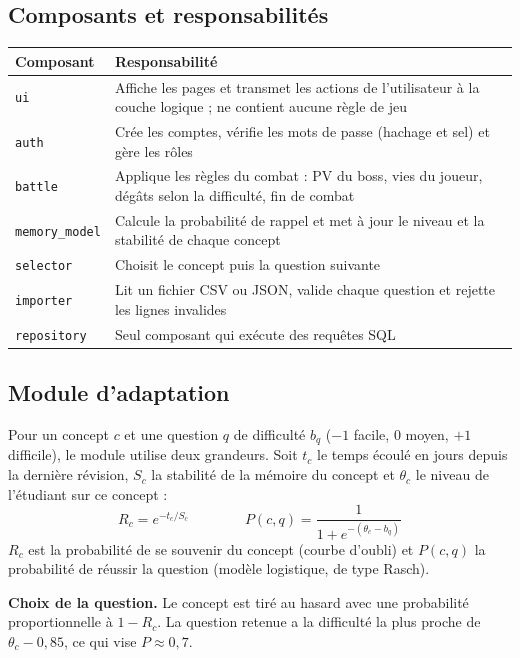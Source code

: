 \documentclass[11pt,a4paper]{article}
\begin{document}
\Needspace{6cm}
\subsection{Composants et responsabilit\'es}
\begin{center}
\small
\begin{longtable}{L{3.2cm}L{12.0cm}}
\toprule
\textbf{Composant} & \textbf{Responsabilit\'e}\\
\midrule
\endhead
\texttt{ui} & Affiche les pages et transmet les actions de l'utilisateur \`a la couche logique ; ne contient aucune r\`egle de jeu\\
\texttt{auth} & Cr\'ee les comptes, v\'erifie les mots de passe (hachage et sel) et g\`ere les r\^oles\\
\texttt{battle} & Applique les r\`egles du combat : PV du boss, vies du joueur, d\'egâts selon la difficult\'e, fin de combat\\
\texttt{memory\_model} & Calcule la probabilit\'e de rappel et met \`a jour le niveau et la stabilit\'e de chaque concept\\
\texttt{selector} & Choisit le concept puis la question suivante\\
\texttt{importer} & Lit un fichier CSV ou JSON, valide chaque question et rejette les lignes invalides\\
\texttt{repository} & Seul composant qui ex\'ecute des requ\^etes SQL\\
\bottomrule
\end{longtable}
\end{center}

\subsection{Module d'adaptation}
Pour un concept $c$ et une question $q$ de difficult\'e $b_q$ ($-1$ facile, $0$ moyen, $+1$ difficile), le module utilise deux grandeurs. Soit $t_c$ le temps \'ecoul\'e en jours depuis la derni\`ere r\'evision, $S_c$ la stabilit\'e de la m\'emoire du concept et $\theta_c$ le niveau de l'\'etudiant sur ce concept :
\[
R_c = e^{-t_c / S_c}
\qquad\qquad
P(c,q) = \frac{1}{1 + e^{-(\theta_c - b_q)}}
\]
$R_c$ est la probabilit\'e de se souvenir du concept (courbe d'oubli) et $P(c,q)$ la probabilit\'e de r\'eussir la question (mod\`ele logistique, de type Rasch).

\textbf{Choix de la question.} Le concept est tir\'e au hasard avec une probabilit\'e proportionnelle \`a $1 - R_c$. La question retenue a la difficult\'e la plus proche de $\theta_c - 0{,}85$, ce qui vise $P \approx 0{,}7$.
\end{document}
